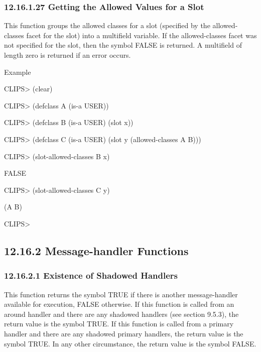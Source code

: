 \documentclass[letterpaper,10pt,english]{sphinxmanual}
\begin{document}
\subsubsection{12.16.1.27 Getting the Allowed Values for a Slot}
\label{\detokenize{actions:getting-the-allowed-values-for-a-slot-1}}\label{\detokenize{actions:id5}}
This function groups the allowed classes for a slot (specified by the
allowed-classes facet for the slot) into a multifield variable. If the
allowed-classes facet was not specified for the slot, then the symbol
FALSE is returned. A multifield of length zero is returned if an error
occurs.


\begin{sphinxVerbatim}[commandchars=\\\{\}]
  
\end{sphinxVerbatim}

Example

CLIPS\textgreater{} (clear)

CLIPS\textgreater{} (defclass A (is-a USER))

CLIPS\textgreater{} (defclass B (is-a USER) (slot x))

CLIPS\textgreater{} (defclass C (is-a USER) (slot y (allowed-classes A B)))

CLIPS\textgreater{} (slot-allowed-classes B x)

FALSE

CLIPS\textgreater{} (slot-allowed-classes C y)

(A B)

CLIPS\textgreater{}


\subsection{12.16.2 Message-handler Functions}
\label{\detokenize{actions:message-handler-functions}}

\subsubsection{12.16.2.1 Existence of Shadowed Handlers}
\label{\detokenize{actions:existence-of-shadowed-handlers}}
This function returns the symbol TRUE if there is another
message-handler available for execution, FALSE otherwise. If this
function is called from an around handler and there are any shadowed
handlers (see section 9.5.3), the return value is the symbol TRUE. If
this function is called from a primary handler and there are any
shadowed primary handlers, the return value is the symbol TRUE. In any
other circumstance, the return value is the symbol FALSE.
\end{document}
